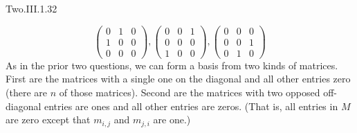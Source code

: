 \begin{ans}{Two.III.1.32}
\begin{exparts}
\begin{equation*}
{\begin{pmatrix}
                0  &1  &0  \\
                1  &0  &0  \\
                0  &0  &0
              \end{pmatrix},
              \begin{pmatrix}
                0  &0  &1  \\
                0  &0  &0  \\
                1  &0  &0
              \end{pmatrix},
              \begin{pmatrix}
                0  &0  &0  \\
                0  &0  &1  \\
                0  &1  &0
              \end{pmatrix}  }
          \end{equation*}
         \partsitem As in the prior two questions, we can form a basis from two
           kinds of  matrices.
           First are the matrices with a single one on the diagonal and all
           other entries zero (there are \( n \) of those matrices).
           Second are the matrices with two opposed off-diagonal entries
           are ones and all other entries are zeros.
           (That is, all entries in $M$ are zero except that
           $m_{i,j}$ and $m_{j,i}$ are one.)
      \end{exparts}
    
\end{ans}
